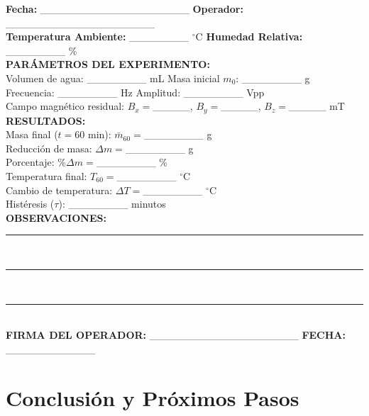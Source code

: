 \documentclass[12pt, a4paper]{article}
\begin{document}
\begin{tcolorbox}[
    colback=gemblue!5,
    colframe=gemblue,
    title=\textbf{\textcolor{white}{HOJA DE REGISTRO GEM-01}},
    fonttitle=\bfseries
]
\textbf{Fecha:} \_\_\_\_\_\_\_\_\_\_\_\_\_\_\_\_\_\_\_\_ \quad \textbf{Operador:} \_\_\_\_\_\_\_\_\_\_\_\_\_\_\_\_\_\_\_\_ \\
\textbf{Temperatura Ambiente:} \_\_\_\_\_\_\_\_ $^\circ$C \quad \textbf{Humedad Relativa:} \_\_\_\_\_\_\_\_ \% \\[0.3cm]

\textbf{PARÁMETROS DEL EXPERIMENTO:} \\
Volumen de agua: \_\_\_\_\_\_\_\_ mL \quad Masa inicial $m_0$: \_\_\_\_\_\_\_\_ g \\
Frecuencia: \_\_\_\_\_\_\_\_ Hz \quad Amplitud: \_\_\_\_\_\_\_\_ Vpp \\
Campo magnético residual: $B_x = $\_\_\_\_\_, $B_y = $\_\_\_\_\_, $B_z = $\_\_\_\_\_ mT \\[0.3cm]

\textbf{RESULTADOS:} \\
Masa final ($t=60$ min): $\bar{m}_{60} = $\_\_\_\_\_\_\_\_ g \\
Reducción de masa: $\Delta m = $\_\_\_\_\_\_\_\_ g \\
Porcentaje: $\% \Delta m = $\_\_\_\_\_\_\_\_ \% \\
Temperatura final: $T_{60} = $\_\_\_\_\_\_\_\_ $^\circ$C \\
Cambio de temperatura: $\Delta T = $\_\_\_\_\_\_\_\_ $^\circ$C \\
Histéresis ($\tau$): \_\_\_\_\_\_\_\_ minutos \\[0.3cm]

\textbf{OBSERVACIONES:} \\
\rule{0.95\textwidth}{0.5pt} \\
\rule{0.95\textwidth}{0.5pt} \\
\rule{0.95\textwidth}{0.5pt} \\[0.3cm]

\textbf{FIRMA DEL OPERADOR:} \_\_\_\_\_\_\_\_\_\_\_\_\_\_\_\_\_\_\_\_ \quad \textbf{FECHA:} \_\_\_\_\_\_\_\_\_\_\_\_
\end{tcolorbox}

\section{Conclusión y Próximos Pasos}
\end{document}
